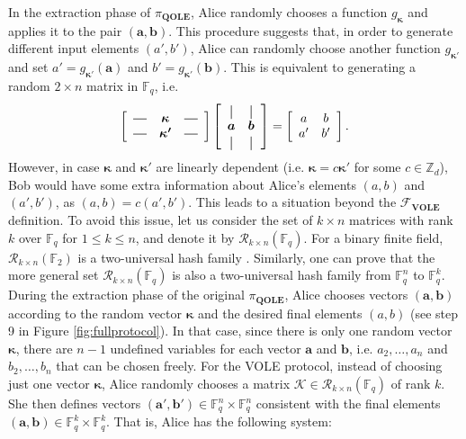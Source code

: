 In the extraction phase of $\pi_{\textbf{QOLE}}$, Alice randomly chooses a function $g_{\bm{\kappa}}$ and applies it to the pair $(\bm{a},\bm{b})$. This procedure suggests that, in order to generate different input elements $(a', b')$, Alice can randomly choose another function $g_{\bm{\kappa'}}$ and set $a' = g_{\bm{\kappa'}}(\bm{a})$ and $b' = g_{\bm{\kappa'}}(\bm{b})$. This is equivalent to generating a random $2\times n$ matrix in  $\mathbb{F}_q$, i.e.
\[
\left[
  \begin{array}{ccc}
    \horzbar & \bm{\kappa} & \horzbar \\
    \horzbar & \bm{\kappa'} & \horzbar \\

  \end{array}
\right] \left[
  \begin{array}{cc}
    \vertbar & \vertbar  \\
    \bm{a} & \bm{b} \\
    \vertbar  & \vertbar \\
  \end{array}
\right]  = \left[
  \begin{array}{cc}
    a & b \\
    a' & b'
  \end{array}
\right].
\]
However, in case $\bm{\kappa}$ and $\bm{\kappa'}$ are linearly dependent (i.e. $\bm{\kappa} = c\bm{\kappa'}$ for some $c\in\mathbb{Z}_d$), Bob would have some extra information about Alice's elements $(a,b)$ and $(a', b')$, as $(a,b) = c( a', b')$. This leads to a situation beyond the  $\mathcal{F}_{\textbf{VOLE}}$ definition. 
To avoid this issue, let us consider the set of $k\times n$ matrices with rank $k$ over $\mathbb{F}_q$ for $1\leq k\leq n$, and denote it by $\mathcal{R}_{k\times n}(\mathbb{F}_q)$. For a binary finite field,  $\mathcal{R}_{k\times n}(\mathbb{F}_2)$ is a two-universal hash family \cite{D21, CW79}. Similarly, one can prove that the more general set $\mathcal{R}_{k\times n}(\mathbb{F}_q)$ is also a two-universal hash family from $\mathbb{F}_q^n$ to $\mathbb{F}_q^k$. During the extraction phase of the original $\pi_{\textbf{QOLE}}$, Alice chooses vectors $(\bm{a}, \bm{b})$ according to the random vector $\bm{\kappa}$ and the desired final elements $(a,b)$ (see step 9 in Figure \ref{fig:fullprotocol}). In that case, since there is only one random vector $\bm{\kappa}$, there are $n-1$ undefined variables for each vector $\bm{a}$ and $\bm{b}$, i.e. $a_2, \ldots, a_n$ and $b_2, \ldots, b_n$ that can be chosen freely. For the VOLE protocol, instead of choosing just one vector $\bm{\kappa}$, Alice randomly chooses a  matrix $\mathcal{K}\in\mathcal{R}_{k\times n}(\mathbb{F}_q)$ of rank $k$. She then defines vectors $(\bm{a}', \bm{b}')\in \mathbb{F}^n_q\times \mathbb{F}^n_q$ consistent with the final elements $(\bm{a}, \bm{b})\in \mathbb{F}^k_q\times \mathbb{F}^k_q$. That is, Alice has the following system:
